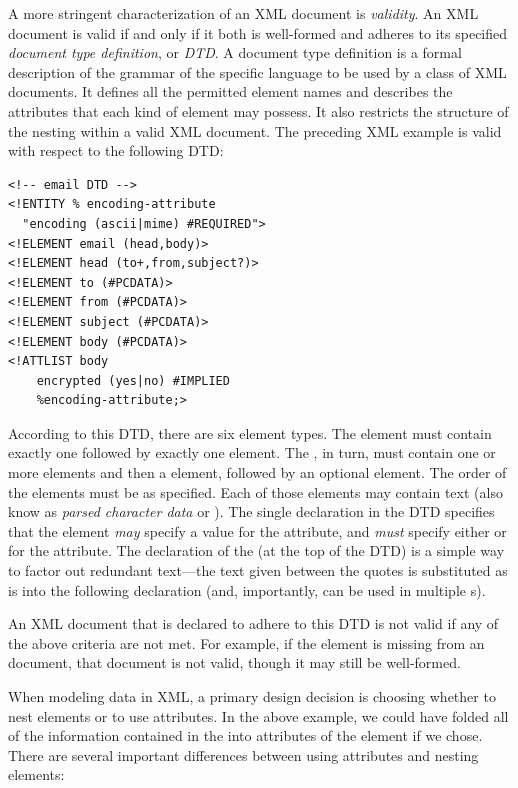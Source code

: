 \documentclass{article}
\begin{document}
\begin{multicols}{2}
A more stringent characterization of an XML document is \emph{validity}.
An XML document is valid if and only if it both is well-formed and
adheres to its specified \emph{document type definition}, or \emph{DTD}.
A document type definition is a formal description of the grammar of the
specific language to be used by a class of XML documents.  It defines
all the permitted element names and describes the attributes that each
kind of element may possess. It also restricts the structure of the
nesting within a valid XML document.  The preceding XML example is valid
with respect to the following DTD:

\begin{verbatim}
<!-- email DTD -->
<!ENTITY % encoding-attribute 
  "encoding (ascii|mime) #REQUIRED">
<!ELEMENT email (head,body)>
<!ELEMENT head (to+,from,subject?)>
<!ELEMENT to (#PCDATA)>
<!ELEMENT from (#PCDATA)>
<!ELEMENT subject (#PCDATA)>
<!ELEMENT body (#PCDATA)>
<!ATTLIST body
    encrypted (yes|no) #IMPLIED
    %encoding-attribute;>
\end{verbatim}

According to this DTD, there are six element types. The 
element must contain exactly one  followed by exactly one
 element.  The , in turn, must contain one
or more  elements and then a  element,
followed by an optional  element.  The order of the
elements must be as specified. Each of those
elements may contain text (also know as \emph{parsed character data} or
).  The single  declaration in the
DTD specifies that the  element \emph{may} specify a
value for the  attribute, and \emph{must} specify
either  or  for the 
attribute. The  declaration of the
 (at the top of the DTD) is a simple way to
factor out redundant text---the text given between the quotes is
substituted as is into the following  declaration
(and, importantly, can be used in multiple s).

An XML document that is declared to adhere to this DTD is not valid if
any of the above criteria are not met.  For example, if the
 element is missing from an  document, that
document is not valid, though it may still be well-formed.

When modeling data in XML, a primary design decision is choosing whether
to nest elements or to use attributes.  In the above example, we could
have folded all of the information contained in the  into
attributes of the  element if we chose.  There are
several important differences between using attributes and nesting
elements:


\end{multicols}
\end{document}
